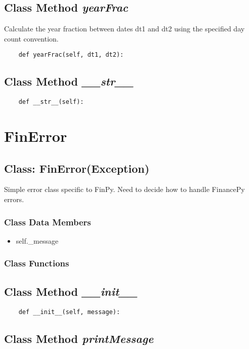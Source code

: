 \documentclass[twoside,11pt]{book}
\begin{document}
\subsection{Class Method {\it yearFrac}}
Calculate the year fraction between dates dt1 and dt2 using the specified day count convention. 

\begin{lstlisting}
    def yearFrac(self, dt1, dt2):
\end{lstlisting}

\subsection{Class Method {\it \_\_str\_\_}}


\begin{lstlisting}
    def __str__(self):
\end{lstlisting}

\newpage
\section{FinError}

\subsection{Class: FinError(Exception)}
Simple error class specific to FinPy. Need to decide how to handle FinancePy errors. 

\subsubsection{Class Data Members}
\begin{itemize}
\item{self.\_message}
\end{itemize}

\subsubsection{Class Functions}

\subsection{Class Method {\it \_\_init\_\_}}


\begin{lstlisting}
    def __init__(self, message):
\end{lstlisting}

\subsection{Class Method {\it printMessage}}
\end{document}
